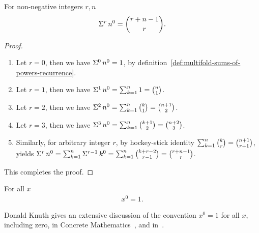 \begin{lemma}
  \label{lem:multifold-sum-of-zero-powers}
  For non-negative integers $r,n$
  \begin{align*}
    \Sigma^{r}\,{n}^{0} = \binom{r+n-1}{r}.
  \end{align*}
  \begin{proof}
    \leavevmode\par
    \begin{enumerate}
      \item Let $r=0$, then we have $\Sigma^{0}\,{n}^{0} = 1$,
        by definition~\eqref{def:multifold-sums-of-powers-recurrence}.
      \item Let $r=1$, then we have
        $\Sigma^{1}\,{n}^{0}
        = \mathop{\textstyle\sum}_{k=1}^{n} 1 = \tbinom{n}{1}$.
      \item Let $r=2$, then we have
        $\Sigma^{2}\,{n}^{0}
        = \mathop{\textstyle\sum}_{k=1}^{n} \tbinom{k}{1}
        = \tbinom{n+1}{2}$.
      \item Let $r=3$, then we have
        $\Sigma^{3}\,{n}^{0}
        = \mathop{\textstyle\sum}_{k=1}^{n} \tbinom{k+1}{2}
        = \tbinom{n+2}{3}$.
      \item Similarly, for arbitrary integer $r$, by hockey-stick identity
        $\mathop{\textstyle\sum}_{k=1}^{n} \tbinom{k}{r} = \tbinom{n+1}{r+1}$,
        yields
        $\Sigma^{r}\,{n}^{0}
        =  \mathop{\textstyle\sum}_{k=1}^{n} \Sigma^{r-1}\,{k}^{0}
        =  \mathop{\textstyle\sum}_{k=1}^{n} \tbinom{k+r-2}{r-1}
        = \tbinom{r+n-1}{r}$.
    \end{enumerate}
    This completes the proof.
  \end{proof}
\end{lemma}

\begin{convention} For all $x$
  \begin{align*}
    x^0 = 1.
  \end{align*}
\end{convention}
Donald Knuth gives an extensive discussion of the convention $x^0=1$ for
all $x$, including zero, in Concrete Mathematics~\cite[p. 162]{graham1994concrete},
and in~\cite{knuth1992notesnotation}.
